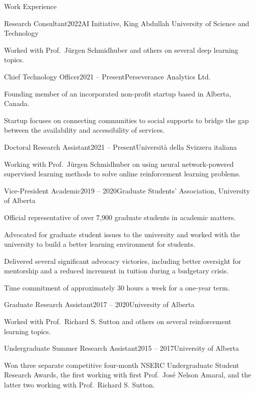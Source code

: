 \documentclass{cv}
\begin{document}
\begin{rSection}{Work Experience}

\begin{rSubsection}{Research Consultant}{2022}{AI Initiative, King Abdullah University of Science and Technology}
    \item Worked with Prof.\ J{\"{u}}rgen Schmidhuber and others on several deep learning topics.
\end{rSubsection}

\begin{rSubsection}{Chief Technology Officer}{2021 -- Present}{Perseverance Analytics Ltd.}
    \item Founding member of an incorporated non-profit startup based in Alberta, Canada.
    \item Startup focuses on connecting communities to social supports to bridge the gap between the availability and accessibility of services.
\end{rSubsection}

\begin{rSubsection}{Doctoral Research Assistant}{2021 -- Present}{Universit{\`{a}} della Svizzera italiana}
    \item Working with Prof.\ J{\"{u}}rgen Schmidhuber on using neural network-powered supervised learning methods to solve online reinforcement learning problems.
\end{rSubsection}

\begin{rSubsection}{Vice-President Academic}{2019 -- 2020}{Graduate Students' Association, University of Alberta}
    \item Official representative of over 7,900 graduate students in academic matters.
    \item Advocated for graduate student issues to the university and worked with the university to build a better learning environment for students.
    \item Delivered several significant advocacy victories, including better oversight for mentorship and a reduced increment in tuition during a budgetary crisis.
    \item Time commitment of approximately 30 hours a week for a one-year term.
\end{rSubsection}

\begin{rSubsection}{Graduate Research Assistant}{2017 -- 2020}{University of Alberta}
    \item Worked with Prof.\ Richard S. Sutton and others on several reinforcement learning topics.
\end{rSubsection}

\begin{rSubsection}{Undergraduate Summer Research Assistant}{2015 -- 2017}{University of Alberta}
    \item Won three separate competitive four-month NSERC Undergraduate Student Research Awards, the first working with first Prof.\ Jos{\'{e}} Nelson Amaral, and the latter two working with Prof.\ Richard S. Sutton.
\end{rSubsection}

\end{rSection}
\end{document}
